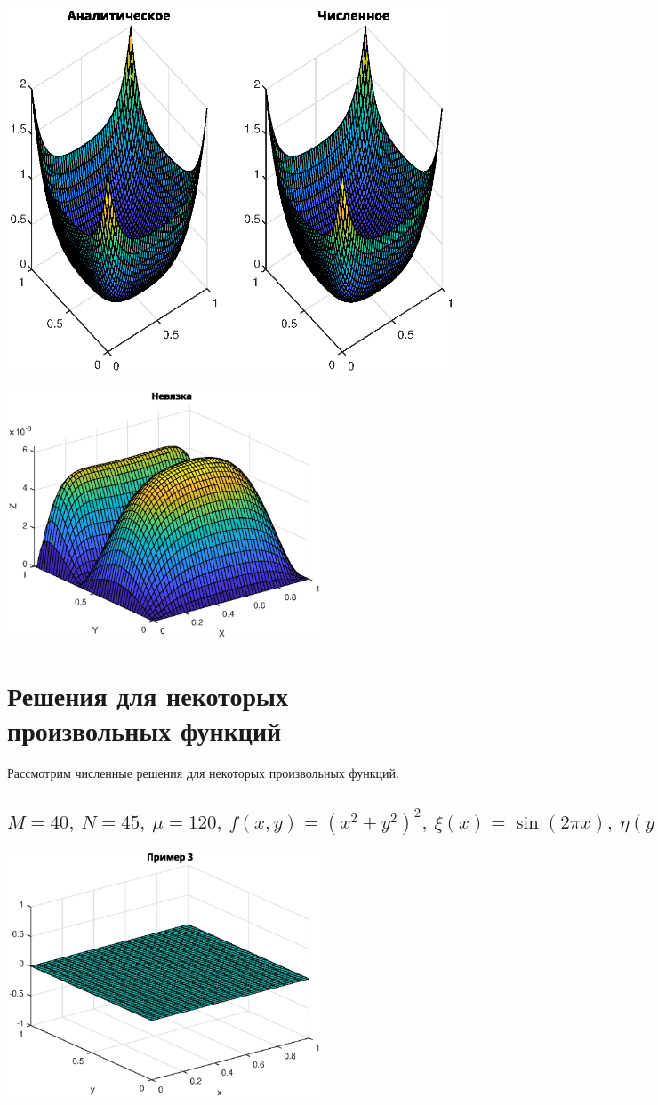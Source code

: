 \documentclass[11pt]{article}
\begin{document}
\includegraphics[width=1.1\textwidth, height=0.5\textheight]{22.eps}

\includegraphics[width=0.7\textwidth]{21.eps}

\section{Решения для некоторых произвольных функций}
Рассмотрим численные решения для некоторых произвольных функций.

\subsection{$M = 40,\ N = 45,\ \mu= 120,\ f(x, y) = (x^2 + y^2)^2,\ \xi(x) = \sin(2\pi x),\ \eta(y) = \sin(-2\pi y)$}

\includegraphics[width=0.7\textwidth]{3.eps}
\end{document}

